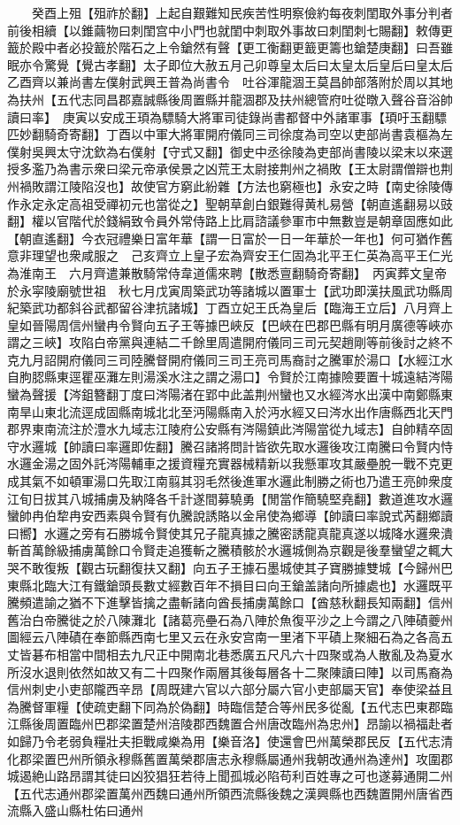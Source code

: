 　　癸酉上殂【殂祚於翻】上起自艱難知民疾苦性明察儉約每夜刺閨取外事分判者前後相續【以錐繭物曰刺閨宫中小門也就閨中刺取外事故曰刺閨刺七賜翻】敕傳更籖於殿中者必投籖於階石之上令鎗然有聲【更工衡翻更籖更籌也鎗楚庚翻】曰吾雖眠亦令驚覺【覺古孝翻】太子即位大赦五月己卯尊皇太后曰太皇太后皇后曰皇太后　乙酉齊以兼尚書左僕射武興王普為尚書令　吐谷渾龍涸王莫昌帥部落附於周以其地為扶州【五代志同昌郡嘉誠縣後周置縣并龍涸郡及扶州總管府吐從暾入聲谷音浴帥讀曰率】　庚寅以安成王頊為驃騎大將軍司徒錄尚書都督中外諸軍事【頊吁玉翻驃匹妙翻騎奇寄翻】丁酉以中軍大將軍開府儀同三司徐度為司空以吏部尚書袁樞為左僕射吳興太守沈欽為右僕射【守式又翻】御史中丞徐陵為吏部尚書陵以梁末以來選授多濫乃為書示衆曰梁元帝承侯景之凶荒王太尉接荆州之禍敗【王太尉謂僧辯也荆州禍敗謂江陵陷沒也】故使官方窮此紛雜【方法也窮極也】永安之時【南史徐陵傳作永定永定高祖受禪初元也當從之】聖朝草創白銀難得黄札易營【朝直遙翻易以豉翻】權以官階代於錢絹致令員外常侍路上比肩諮議參軍市中無數豈是朝章固應如此【朝直遙翻】今衣冠禮樂日富年華【謂一日富於一日一年華於一年也】何可猶作舊意非理望也衆咸服之　己亥齊立上皇子宏為齊安王仁固為北平王仁英為高平王仁光為淮南王　六月齊遣兼散騎常侍韋道儒來聘【散悉亶翻騎奇寄翻】　丙寅葬文皇帝於永寜陵廟號世祖　秋七月戊寅周築武功等諸城以置軍士【武功即漢扶風武功縣周紀築武功都斜谷武都留谷津抗諸城】丁酉立妃王氏為皇后【臨海王立后】八月齊上皇如晉陽周信州蠻冉令賢向五子王等據巴峽反【巴峽在巴郡巴縣有明月廣德等峽亦謂之三峽】攻陷白帝黨與連結二千餘里周遣開府儀同三司元契趙剛等前後討之終不克九月詔開府儀同三司陸騰督開府儀同三司王亮司馬裔討之騰軍於湯口【水經江水自朐䏰縣東逕瞿巫灘左則湯溪水注之謂之湯口】令賢於江南據險要置十城遠結涔陽蠻為聲援【涔鉏簪翻丁度曰涔陽渚在郢中此盖荆州蠻也又水經涔水出漢中南鄭縣東南旱山東北流逕成固縣南城北北至沔陽縣南入於沔水經又曰涔水出作唐縣西北天門郡界東南流注於澧水九域志江陵府公安縣有涔陽鎮此涔陽當從九域志】自帥精卒固守水邏城【帥讀曰率邏即佐翻】騰召諸將問計皆欲先取水邏後攻江南騰曰令賢内恃水邏金湯之固外託涔陽輔車之援資糧充實器械精新以我懸軍攻其嚴壘脫一戰不克更成其氣不如頓軍湯口先取江南翦其羽毛然後進軍水邏此制勝之術也乃遣王亮帥衆度江旬日拔其八城捕虜及納降各千計遂間募驍勇【閒當作簡驍堅堯翻】數道進攻水邏蠻帥冉伯犂冉安西素與令賢有仇騰說誘賂以金帛使為鄉導【帥讀曰率說式芮翻鄉讀曰嚮】水邏之旁有石勝城令賢使其兄子龍真據之騰密誘龍真龍真遂以城降水邏衆潰斬首萬餘級捕虜萬餘口令賢走追獲斬之騰積骸於水邏城側為京觀是後羣蠻望之輒大哭不敢復叛【觀古玩翻復扶又翻】向五子王據石墨城使其子寶勝據雙城【今歸州巴東縣北臨大江有鐵鎗頭長數丈經數百年不損目曰向王鎗盖諸向所據處也】水邏既平騰頻遣諭之猶不下進擊皆擒之盡斬諸向酋長捕虜萬餘口【酋慈秋翻長知兩翻】信州舊治白帝騰徙之於八陳灘北【諸葛亮壘石為八陣於魚復平沙之上今謂之八陣磧夔州圖經云八陣磧在奉節縣西南七里又云在永安宫南一里渚下平磧上聚細石為之各高五丈皆碁布相當中間相去九尺正中開南北巷悉廣五尺凡六十四聚或為人散亂及為夏水所沒水退則依然如故又有二十四聚作兩層其後每層各十二聚陳讀曰陣】以司馬裔為信州刺史小吏部隴西辛昂【周既建六官以六部分屬六官小吏部屬天官】奉使梁益且為騰督軍糧【使疏吏翻下同為於偽翻】時臨信楚合等州民多從亂【五代志巴東郡臨江縣後周置臨州巴郡梁置楚州涪陵郡西魏置合州唐改臨州為忠州】昂諭以禍福赴者如歸乃令老弱負糧壯夫拒戰咸樂為用【樂音洛】使還會巴州萬榮郡民反【五代志清化郡梁置巴州所領永穆縣舊置萬榮郡唐志永穆縣屬通州我朝改通州為達州】攻圍郡城遏絶山路昂謂其徒曰凶狡猖狂若待上聞孤城必陷苟利百姓專之可也遂募通開二州【五代志通州郡梁置萬州西魏曰通州所領西流縣後魏之漢興縣也西魏置開州唐省西流縣入盛山縣杜佑曰通州